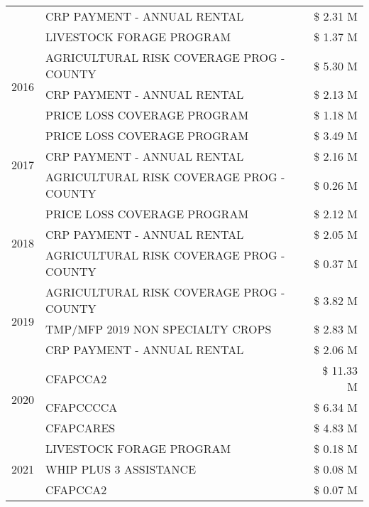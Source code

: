 \begin{tabular}{llr}
 & CRP PAYMENT - ANNUAL RENTAL & \$ 2.31 M \\
 & LIVESTOCK FORAGE PROGRAM & \$ 1.37 M \\
\cline{1-3}
\multirow[t]{3}{*}{2016} & AGRICULTURAL RISK COVERAGE PROG - COUNTY      & \$ 5.30 M \\
 & CRP PAYMENT - ANNUAL RENTAL                   & \$ 2.13 M \\
 & PRICE LOSS COVERAGE PROGRAM                   & \$ 1.18 M \\
\cline{1-3}
\multirow[t]{3}{*}{2017} & PRICE LOSS COVERAGE PROGRAM & \$ 3.49 M \\
 & CRP PAYMENT - ANNUAL RENTAL & \$ 2.16 M \\
 & AGRICULTURAL RISK COVERAGE PROG - COUNTY & \$ 0.26 M \\
\cline{1-3}
\multirow[t]{3}{*}{2018} & PRICE LOSS COVERAGE PROGRAM & \$ 2.12 M \\
 & CRP PAYMENT - ANNUAL RENTAL & \$ 2.05 M \\
 & AGRICULTURAL RISK COVERAGE PROG - COUNTY & \$ 0.37 M \\
\cline{1-3}
\multirow[t]{3}{*}{2019} & AGRICULTURAL RISK COVERAGE PROG - COUNTY & \$ 3.82 M \\
 & TMP/MFP 2019 NON SPECIALTY CROPS & \$ 2.83 M \\
 & CRP PAYMENT - ANNUAL RENTAL & \$ 2.06 M \\
\cline{1-3}
\multirow[t]{3}{*}{2020} & CFAPCCA2 & \$ 11.33 M \\
 & CFAPCCCCA & \$ 6.34 M \\
 & CFAPCARES & \$ 4.83 M \\
\cline{1-3}
\multirow[t]{3}{*}{2021} & LIVESTOCK FORAGE PROGRAM & \$ 0.18 M \\
 & WHIP PLUS 3 ASSISTANCE & \$ 0.08 M \\
 & CFAPCCA2 & \$ 0.07 M \\
\cline{1-3}
\bottomrule
\end{tabular}
